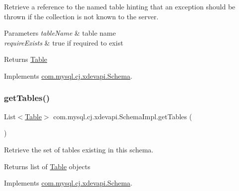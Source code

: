 Retrieve a reference to the named table hinting that an exception should be thrown if the collection is not known to the server.


\begin{DoxyParams}{Parameters}
{\em table\+Name} & table name \\
\hline
{\em require\+Exists} & true if required to exist \\
\hline
\end{DoxyParams}
\begin{DoxyReturn}{Returns}
\mbox{\hyperlink{interfacecom_1_1mysql_1_1cj_1_1xdevapi_1_1_table}{Table}} 
\end{DoxyReturn}


Implements \mbox{\hyperlink{interfacecom_1_1mysql_1_1cj_1_1xdevapi_1_1_schema_a555b3596a60f576785190870c67f8ef5}{com.\+mysql.\+cj.\+xdevapi.\+Schema}}.

\mbox{\label{classcom_1_1mysql_1_1cj_1_1xdevapi_1_1_schema_impl_a437e825fdc3d104e630dda918ccbfa72}} 
\subsubsection{\texorpdfstring{get\+Tables()}{getTables()}\hspace{0.1cm}{\footnotesize\ttfamily [1/2]}}
{\footnotesize\ttfamily List$<$\mbox{\hyperlink{interfacecom_1_1mysql_1_1cj_1_1xdevapi_1_1_table}{Table}}$>$ com.\+mysql.\+cj.\+xdevapi.\+Schema\+Impl.\+get\+Tables (\begin{DoxyParamCaption}{ }\end{DoxyParamCaption})}

Retrieve the set of tables existing in this schema.

\begin{DoxyReturn}{Returns}
list of \mbox{\hyperlink{interfacecom_1_1mysql_1_1cj_1_1xdevapi_1_1_table}{Table}} objects 
\end{DoxyReturn}


Implements \mbox{\hyperlink{interfacecom_1_1mysql_1_1cj_1_1xdevapi_1_1_schema_a33149bd057a049634d070e97848b8ca1}{com.\+mysql.\+cj.\+xdevapi.\+Schema}}.

\mbox{\label{classcom_1_1mysql_1_1cj_1_1xdevapi_1_1_schema_impl_ae9ce3609e108dc05f1e4ca978d490b81}} 
